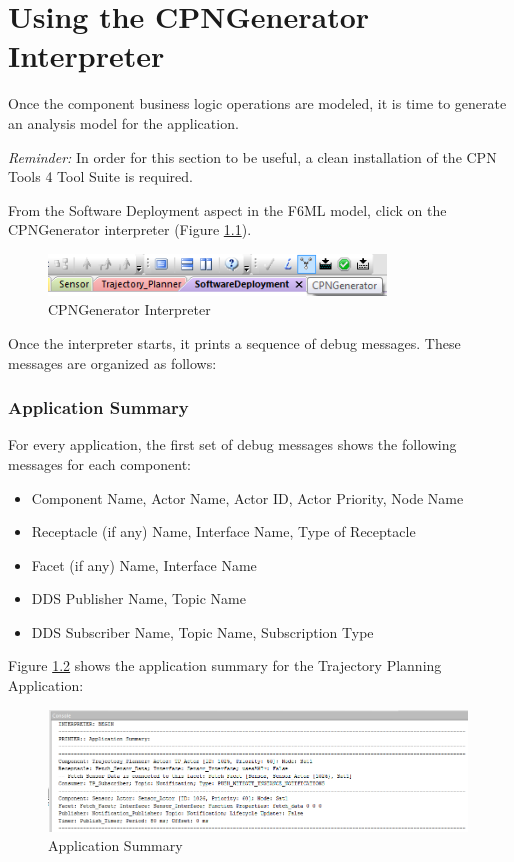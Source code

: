 \chapter{Using the CPNGenerator Interpreter}

Once the component business logic operations are modeled, it is time to generate an analysis model for the application. 

\emph{Reminder:} In order for this section to be useful, a clean installation of the CPN Tools 4 Tool Suite is required. 

From the Software Deployment aspect in the F6ML model, click on the CPNGenerator interpreter (Figure \ref{fig:interpreter}).

\begin{figure}[ht]
\centering
\includegraphics[width=0.80\textwidth]{./figs/interpreter}
\caption{CPNGenerator Interpreter}
\label{fig:interpreter}
\vspace{-0.2in}
\end{figure}
\vspace{0.1in} 

Once the interpreter starts, it prints a sequence of debug messages. These messages are organized as follows: 

\subsection{Application Summary}

For every application, the first set of debug messages shows the following messages for each component: 
\begin{itemize}
\item Component Name, Actor Name, Actor ID, Actor Priority, Node Name
\item Receptacle (if any) Name, Interface Name, Type of Receptacle
\item Facet (if any) Name, Interface Name
\item DDS Publisher Name, Topic Name
\item DDS Subscriber Name, Topic Name, Subscription Type
\end{itemize}

Figure \ref{fig:app_summary_1} shows the application summary for the Trajectory Planning Application: 

\begin{figure}[ht]
\centering
\includegraphics[width=0.99\textwidth]{./figs/app_summary_1}
\caption{Application Summary}
\label{fig:app_summary_1}
\vspace{-0.2in}
\end{figure}
\vspace{0.1in} 

